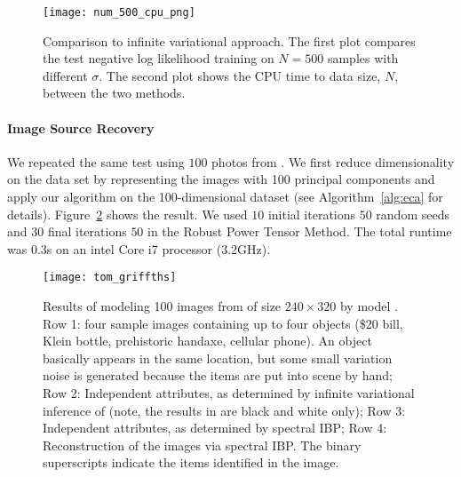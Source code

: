 \documentclass[twoside,11pt]{article}
\begin{document}
{\begin{figure}[ht]
\begin{center}
\centerline{\texttt{[image: num\_500\_cpu\_png]}}
\caption{ Comparison to infinite variational approach. The first plot compares the test negative log likelihood training on $N=500$ samples with different $\sigma$. The second plot shows the CPU time to data size, $N$, between the two methods.
 }
\label{fig:compare}
\end{center}
\vskip -0.2in
\end{figure} 

\paragraph{Image Source Recovery}

We repeated the same test using $100$ photos from 
\cite{GriGha11}. We first reduce dimensionality on the data set by
representing the images with 100 principal components and apply our
algorithm on the 100-dimensional dataset (see Algorithm~\ref{alg:eca}
for details).  Figure~\ref{fig:griff} shows the result. We used $10$ initial
iterations $50$ random seeds and $30$ final
iterations $50$ in the Robust Power Tensor Method. The total runtime was $0.3$s on an intel Core i7 processor (3.2GHz).

\begin{figure}[tb]
\vspace{-5mm}
\begin{center}
    \texttt{[image: tom\_griffths]}
    \end{center}
  \hfill
    \vspace{-5mm}
    \caption{Results of modeling 100 images from \cite{GriGha11} of size $240 \times 320$
      by model . Row 1: four sample
      images containing up to four objects (\$20 bill, Klein bottle,
      prehistoric handaxe, cellular phone). An object basically
      appears in the same location, but some small variation noise is
      generated because the items are put into scene by hand; 
      Row 2: Independent attributes, as determined by infinite
      variational inference of \cite{DosMilGaeTeh09} (note, the
      results in \cite{GriGha11} are black and white only);
      Row 3: Independent attributes, as determined by spectral IBP;
      Row 4: Reconstruction of the images via spectral IBP. The binary
      superscripts indicate the items identified in the image.
      \label{fig:griff}}
  \vspace{-3mm}
\end{figure} 

}
\end{document}
